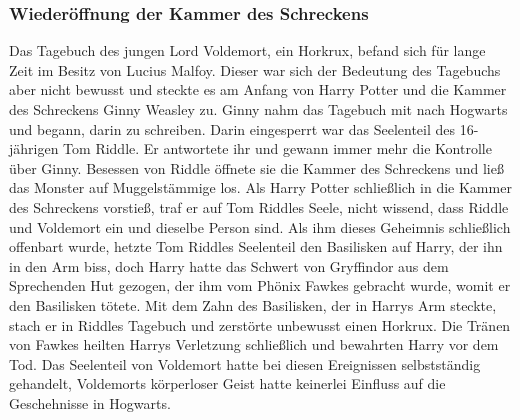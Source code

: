 \documentclass[a4paper, 10pt]{article}
\begin{document}
\subsubsection*{\large Wiederöffnung der Kammer des Schreckens}
Das Tagebuch des jungen Lord Voldemort, ein Horkrux, befand sich für lange Zeit im Besitz von Lucius Malfoy. Dieser war sich der Bedeutung des Tagebuchs aber nicht bewusst und steckte es am Anfang von Harry Potter und die Kammer des Schreckens Ginny Weasley zu.
\vspace{10pt}
\newline
Ginny nahm das Tagebuch mit nach Hogwarts und begann, darin zu schreiben. Darin eingesperrt war das Seelenteil des 16-jährigen Tom Riddle. Er antwortete ihr und gewann immer mehr die Kontrolle über Ginny. Besessen von Riddle öffnete sie die Kammer des Schreckens und ließ das Monster auf Muggelstämmige los.
\vspace{10pt}
\newline
Als Harry Potter schließlich in die Kammer des Schreckens vorstieß, traf er auf Tom Riddles Seele, nicht wissend, dass Riddle und Voldemort ein und dieselbe Person sind. Als ihm dieses Geheimnis schließlich offenbart wurde, hetzte Tom Riddles Seelenteil den Basilisken auf Harry, der ihn in den Arm biss, doch Harry hatte das Schwert von Gryffindor aus dem Sprechenden Hut gezogen, der ihm vom Phönix Fawkes gebracht wurde, womit er den Basilisken tötete. Mit dem Zahn des Basilisken, der in Harrys Arm steckte, stach er in Riddles Tagebuch und zerstörte unbewusst einen Horkrux. Die Tränen von Fawkes heilten Harrys Verletzung schließlich und bewahrten Harry vor dem Tod.
\vspace{10pt}
\newline
Das Seelenteil von Voldemort hatte bei diesen Ereignissen selbstständig gehandelt, Voldemorts körperloser Geist hatte keinerlei Einfluss auf die Geschehnisse in Hogwarts.
\end{document}
